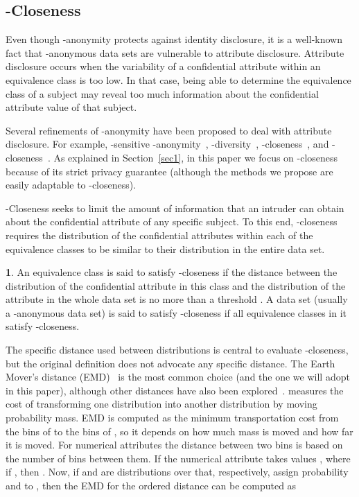 \documentclass[10pt,journal,compsoc]{IEEEtran}
\theoremstyle{definition}
\newtheorem{defn}{\protect\definitionname}
\theoremstyle{plain}
\providecommand{\definitionname}{Definition}
\begin{document}
\subsection{-Closeness}

Even though -anonymity protects against identity disclosure, 
it is a well-known fact that -anonymous data sets are vulnerable
to attribute disclosure. Attribute disclosure occurs when the variability
of a confidential attribute within an equivalence class is too low.
In that case, being able to determine the equivalence class of a subject 
may reveal too much information about the
confidential attribute value of that subject.

Several refinements of -anonymity have been proposed to deal
with attribute disclosure. For example, -sensitive -anonymity~\cite{Truta2006pSensitive},
-diversity~\cite{Machanavajjhala2007lDiversity}, -closeness~\cite{Li2007t-Closeness},
and -closeness~\cite{Li2010Closeness}. As explained
in Section~\ref{sec1}, in this paper we
focus on -closeness because of its strict privacy guarantee 
(although the methods we propose are easily
adaptable to -closeness). 

-Closeness seeks to limit the amount of information that
an intruder can obtain about the
confidential attribute of any specific subject. 
To this end, -closeness requires 
the distribution of the confidential
attributes within each of the equivalence classes 
to be similar to their distribution
in the entire data set. 
\begin{defn}
	An equivalence class is said to satisfy -closeness if the distance
	between the distribution of the confidential attribute in this class
	and the distribution of the attribute in the whole data set is no more
	than a threshold . A data set (usually 
a -anonymous data set) is said to satisfy -closeness if all
	equivalence classes in it satisfy -closeness.
\end{defn}

The specific distance used between distributions is central to evaluate 
-closeness, but the original definition does not advocate any specific
distance. The Earth Mover's distance (EMD)~\cite{Rubner2000Earth} 
is the most common choice (and the one we will adopt in this paper),
although other distances have also been 
explored~\cite{Rebollo,Soria2013differential,DomingoSoria15}.
 measures the cost of transforming one distribution  
into another distribution  by moving probability mass.
EMD is computed as the minimum transportation
cost from the bins of  to the bins of , so it 
depends on how much mass is moved and how far it is moved.
For numerical attributes the distance between two bins is
based on the number of bins between them. If the numerical
attribute takes values , where 
if , then . 
Now, if  and  are distributions over 
that, respectively, assign probability  and  to ,
then the EMD for the ordered distance can be computed as
\end{document}
